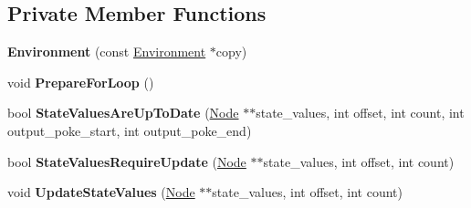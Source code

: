 \subsection*{Private Member Functions}
\begin{DoxyCompactItemize}
\item 
{\bfseries Environment} (const \hyperlink{classv8_1_1internal_1_1compiler_1_1_bytecode_graph_builder_1_1_environment}{Environment} $\ast$copy)\hypertarget{classv8_1_1internal_1_1compiler_1_1_bytecode_graph_builder_1_1_environment_a673ec0c05596c3b497438d5e0a1250b5}{}\label{classv8_1_1internal_1_1compiler_1_1_bytecode_graph_builder_1_1_environment_a673ec0c05596c3b497438d5e0a1250b5}

\item 
void {\bfseries Prepare\+For\+Loop} ()\hypertarget{classv8_1_1internal_1_1compiler_1_1_bytecode_graph_builder_1_1_environment_a02ffcf63c10063e8fae1b324c842c1db}{}\label{classv8_1_1internal_1_1compiler_1_1_bytecode_graph_builder_1_1_environment_a02ffcf63c10063e8fae1b324c842c1db}

\item 
bool {\bfseries State\+Values\+Are\+Up\+To\+Date} (\hyperlink{classv8_1_1internal_1_1compiler_1_1_node}{Node} $\ast$$\ast$state\+\_\+values, int offset, int count, int output\+\_\+poke\+\_\+start, int output\+\_\+poke\+\_\+end)\hypertarget{classv8_1_1internal_1_1compiler_1_1_bytecode_graph_builder_1_1_environment_a219c0d918e594b2d64eff683900e6d15}{}\label{classv8_1_1internal_1_1compiler_1_1_bytecode_graph_builder_1_1_environment_a219c0d918e594b2d64eff683900e6d15}

\item 
bool {\bfseries State\+Values\+Require\+Update} (\hyperlink{classv8_1_1internal_1_1compiler_1_1_node}{Node} $\ast$$\ast$state\+\_\+values, int offset, int count)\hypertarget{classv8_1_1internal_1_1compiler_1_1_bytecode_graph_builder_1_1_environment_ab8f88c96b2afe720062fc965681b489b}{}\label{classv8_1_1internal_1_1compiler_1_1_bytecode_graph_builder_1_1_environment_ab8f88c96b2afe720062fc965681b489b}

\item 
void {\bfseries Update\+State\+Values} (\hyperlink{classv8_1_1internal_1_1compiler_1_1_node}{Node} $\ast$$\ast$state\+\_\+values, int offset, int count)\hypertarget{classv8_1_1internal_1_1compiler_1_1_bytecode_graph_builder_1_1_environment_a26c235c3b16bc0894a4ef63c4faabd01}{}\label{classv8_1_1internal_1_1compiler_1_1_bytecode_graph_builder_1_1_environment_a26c235c3b16bc0894a4ef63c4faabd01}


\end{DoxyCompactItemize}
